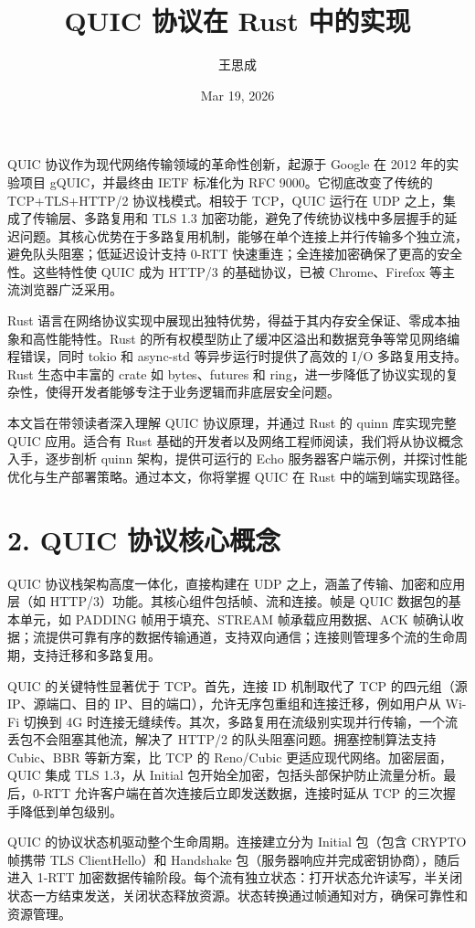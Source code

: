 \title{QUIC 协议在 Rust 中的实现}
\author{王思成}
\date{Mar 19, 2026}
\maketitle
QUIC 协议作为现代网络传输领域的革命性创新，起源于 Google 在 2012 年的实验项目 gQUIC，并最终由 IETF 标准化为 RFC 9000。它彻底改变了传统的 TCP+TLS+HTTP/2 协议栈模式。相较于 TCP，QUIC 运行在 UDP 之上，集成了传输层、多路复用和 TLS 1.3 加密功能，避免了传统协议栈中多层握手的延迟问题。其核心优势在于多路复用机制，能够在单个连接上并行传输多个独立流，避免队头阻塞；低延迟设计支持 0-RTT 快速重连；全连接加密确保了更高的安全性。这些特性使 QUIC 成为 HTTP/3 的基础协议，已被 Chrome、Firefox 等主流浏览器广泛采用。\par
Rust 语言在网络协议实现中展现出独特优势，得益于其内存安全保证、零成本抽象和高性能特性。Rust 的所有权模型防止了缓冲区溢出和数据竞争等常见网络编程错误，同时 tokio 和 async-std 等异步运行时提供了高效的 I/O 多路复用支持。Rust 生态中丰富的 crate 如 bytes、futures 和 ring，进一步降低了协议实现的复杂性，使得开发者能够专注于业务逻辑而非底层安全问题。\par
本文旨在带领读者深入理解 QUIC 协议原理，并通过 Rust 的 quinn 库实现完整 QUIC 应用。适合有 Rust 基础的开发者以及网络工程师阅读，我们将从协议概念入手，逐步剖析 quinn 架构，提供可运行的 Echo 服务器客户端示例，并探讨性能优化与生产部署策略。通过本文，你将掌握 QUIC 在 Rust 中的端到端实现路径。\par
\chapter{2. QUIC 协议核心概念}
QUIC 协议栈架构高度一体化，直接构建在 UDP 之上，涵盖了传输、加密和应用层（如 HTTP/3）功能。其核心组件包括帧、流和连接。帧是 QUIC 数据包的基本单元，如 PADDING 帧用于填充、STREAM 帧承载应用数据、ACK 帧确认收据；流提供可靠有序的数据传输通道，支持双向通信；连接则管理多个流的生命周期，支持迁移和多路复用。\par
QUIC 的关键特性显著优于 TCP。首先，连接 ID 机制取代了 TCP 的四元组（源 IP、源端口、目的 IP、目的端口），允许无序包重组和连接迁移，例如用户从 Wi-Fi 切换到 4G 时连接无缝续传。其次，多路复用在流级别实现并行传输，一个流丢包不会阻塞其他流，解决了 HTTP/2 的队头阻塞问题。拥塞控制算法支持 Cubic、BBR 等新方案，比 TCP 的 Reno/Cubic 更适应现代网络。加密层面，QUIC 集成 TLS 1.3，从 Initial 包开始全加密，包括头部保护防止流量分析。最后，0-RTT 允许客户端在首次连接后立即发送数据，连接时延从 TCP 的三次握手降低到单包级别。\par
QUIC 的协议状态机驱动整个生命周期。连接建立分为 Initial 包（包含 CRYPTO 帧携带 TLS ClientHello）和 Handshake 包（服务器响应并完成密钥协商），随后进入 1-RTT 加密数据传输阶段。每个流有独立状态：打开状态允许读写，半关闭状态一方结束发送，关闭状态释放资源。状态转换通过帧通知对方，确保可靠性和资源管理。\par
